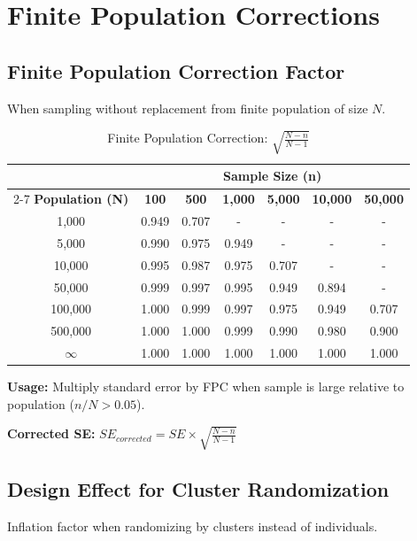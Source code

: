 \newpage

\section{Finite Population Corrections}

\subsection{Finite Population Correction Factor}

When sampling without replacement from finite population of size $N$.

\begin{table}[h]
\centering
\caption{Finite Population Correction: $\sqrt{\frac{N-n}{N-1}}$}
\begin{tabular}{c|cccccc}
\toprule
& \multicolumn{6}{c}{\textbf{Sample Size (n)}} \\
\cmidrule{2-7}
\textbf{Population (N)} & \textbf{100} & \textbf{500} & \textbf{1,000} & \textbf{5,000} & \textbf{10,000} & \textbf{50,000} \\
\midrule
1,000 & 0.949 & 0.707 & - & - & - & - \\
5,000 & 0.990 & 0.975 & 0.949 & - & - & - \\
10,000 & 0.995 & 0.987 & 0.975 & 0.707 & - & - \\
50,000 & 0.999 & 0.997 & 0.995 & 0.949 & 0.894 & - \\
100,000 & 1.000 & 0.999 & 0.997 & 0.975 & 0.949 & 0.707 \\
500,000 & 1.000 & 1.000 & 0.999 & 0.990 & 0.980 & 0.900 \\
$\infty$ & 1.000 & 1.000 & 1.000 & 1.000 & 1.000 & 1.000 \\
\bottomrule
\end{tabular}
\end{table}

\textbf{Usage:} Multiply standard error by FPC when sample is large relative to population ($n/N > 0.05$).

\textbf{Corrected SE:} $SE_{corrected} = SE \times \sqrt{\frac{N-n}{N-1}}$

\subsection{Design Effect for Cluster Randomization}

Inflation factor when randomizing by clusters instead of individuals.


